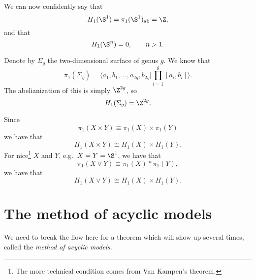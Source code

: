 \documentclass[main.tex]{subfiles}
\begin{document}
\begin{example}
  We can now confidently say that
  \begin{equation*}
    H_{1}(\S^{1}) = \pi_{1}(\S^{1})_{\mathrm{ab}} = \Z,
  \end{equation*}
  and that
  \begin{equation*}
    H_{1}(\S^{n}) = 0,\qquad n > 1.
  \end{equation*}
\end{example}

\begin{example}
  Denote by $\Sigma_{g}$ the two-dimensional surface of genus $g$. We know that
  \begin{equation*}
    \pi_{1}(\Sigma_{g}) = \langle a_{1}, b_{1}, \ldots, a_{2g}, b_{2g} | \prod_{i = 1}^{g} [a_{i}, b_{i}] \rangle.
  \end{equation*}
  The abelianization of this is simply $\Z^{2g}$, so
  \begin{equation*}
    H_{1}(\Sigma_{g}) = \Z^{2g}.
  \end{equation*}
\end{example}

\begin{example}
  Since
  \begin{equation*}
    \pi_{1}(X \times Y) \equiv \pi_{1}(X) \times \pi_{1}(Y)
  \end{equation*}
  we have that
  \begin{equation*}
    H_{1}(X \times Y) \cong H_{1}(X) \times H_{1}(Y).
  \end{equation*}
  For nice\footnote{The more technical condition comes from Van Kampen's theorem.} \(X\) and \(Y\), e.g.\ \(X = Y = \S^{1}\), we have that
  \begin{equation*}
    \pi_{1}(X \vee Y) \equiv \pi_{1}(X) * \pi_{1}(Y),
  \end{equation*}
  we have that
  \begin{equation*}
    H_{1}(X \vee Y) \cong H_{1}(X) \times H_{1}(Y).
  \end{equation*}
\end{example}

\section{The method of acyclic models}
\label{sec:the_method_of_acyclic_models}

We need to break the flow here for a theorem which will show up several times, called the \emph{method of acyclic models.}
\end{document}
